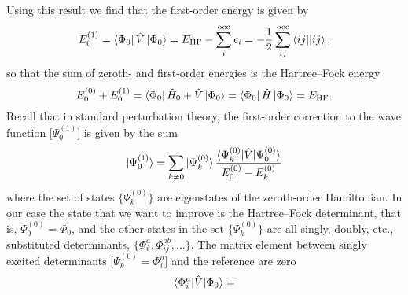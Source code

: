 \documentclass[../Main/chem532-notes.tex]{subfiles}
\begin{document}


Using this result we find that the first-order energy is given by
\begin{equation}
E^{(1)}_0 = \bra{\Phi_0} \hat{V} \ket{\Phi_0} = E_\mathrm{HF} - \sum_i^{\mathrm{occ}} \epsilon_i = -\frac{1}{2} \sum_{ij}^{\rm occ} \bra{ij}\!\ket{ij},
\end{equation}
so that the sum of zeroth- and first-order energies is the Hartree--Fock energy
\begin{equation}
E^{(0)}_0 + E^{(1)}_0 = \bra{\Phi_0} \hat{H}_0 + \hat{V} \ket{\Phi_0} = \bra{\Phi_0}  \hat{H} \ket{\Phi_0} =  E_\mathrm{HF}.
\end{equation}
Recall that in standard perturbation theory, the first-order correction to the wave function [$\Psi_0^{(1)}$] is given by the sum
\begin{equation}
\ket{\Psi_0^{(1)}} = \sum_{k \neq 0} \ket{\Psi_k^{(0)}} \frac{\braket{\Psi_k^{(0)}|\hat{V}|\Psi_0^{(0)}}}{E_0^{(0)} - E_k^{(0)}}
\end{equation}
where the set of states $\{\Psi_k^{(0)}\}$ are eigenstates of the zeroth-order Hamiltonian.
In our case the state that we want to improve is the Hartree--Fock determinant, that is, $\Psi_0^{(0)} = \Phi_0$, and the other states in the set $\{\Psi_k^{(0)}\}$ are all singly, doubly, etc., substituted determinants, $\{\Phi_{i}^{a}, \Phi_{ij}^{ab}, \ldots \}$.
The matrix element between singly excited determinants [$\Psi_k^{(0)} = \Phi_{i}^{a}$]  and the reference are zero
\begin{equation}
\braket{\Phi_{i}^{a}|\hat{V}|\Phi_0} = 
\end{equation}
\end{document}
